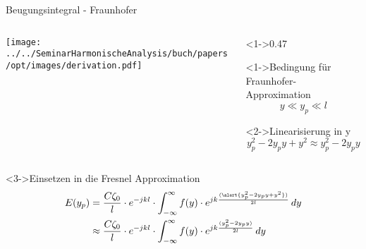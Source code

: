 \begin{frame}{Beugungsintegral - Fraunhofer}
    \begin{columns}
        \begin{column}[onlytextwidth]{0.47\textwidth}
            \centering
            \texttt{[image: ../../SeminarHarmonischeAnalysis/buch/papers/opt/images/derivation.pdf]}
        \end{column}
        \begin{column}[onlytextwidth]<1->{0.47\textwidth}
            \begin{alertblock}<1->{Bedingung für Fraunhofer-Approximation}
                \begin{equation*}
                    y
                    \ll
                    y_p
                    \ll
                    l
                \end{equation*}
            \end{alertblock}
            \begin{block}<2->{Linearisierung in y}
                \begin{equation*}
                    y_p^2 - 2y_py + y^2 \approx y_p^2 - 2y_py
                \end{equation*}
            \end{block}
        \end{column}
    \end{columns}
    \begin{block}<3->{Einsetzen in die Fresnel Approximation}
        \begin{align*}
            E(y_p)
            &=
            \frac{C\zeta_0}{l} \cdot e^{-jkl} \cdot \int_{-\infty}^{\infty}f(y)\cdot e^{jk\frac{(\alert{y_p^2 - 2y_py + y^2})}{2l}} \,dy
            \\
            &\approx
            \frac{C\zeta_0}{l} \cdot e^{-jkl} \cdot \int_{-\infty}^{\infty}f(y)\cdot e^{jk\frac{(y_p^2 - 2y_py)}{2l}} \,dy
        \end{align*}
    \end{block}
\end{frame}

